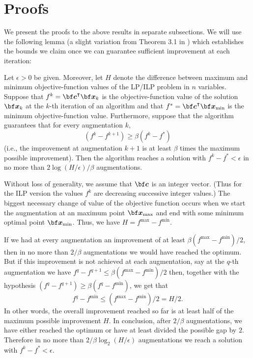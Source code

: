 \documentclass[moor]{informs1hack}              %
\def\ve#1{\mathchoice{\mbox{\boldmath$\displaystyle\bf#1$}}
{\mbox{\boldmath$\textstyle\bf#1$}}
{\mbox{\boldmath$\scriptstyle\bf#1$}}
{\mbox{\boldmath$\scriptscriptstyle\bf#1$}}}
\newcommand\vecc{{\ve c}}
\newcommand\vex{{\ve x}}
\newcommand{\T}{{\intercal}} %
\begin{document}

\section{Proofs}

We present the proofs to the above results in separate subsections. We will use the following  lemma (a slight variation from Theorem 3.1 in \cite{Ahuja+Magnanti+Orlin}) which  establishes the bounds we claim once we can guarantee sufficient improvement at each iteration:
\begin{lemma}
\label{Lemma: Sufficient improvement leads to polynomial algorithm}

Let $\epsilon>0$ be given. Moreover, let $H$ denote the difference between maximum and minimum objective-function values of the LP/ILP problem in $n$ variables.
Suppose that $f^k=\vecc^\T \vex_k$ is the objective-function value of the solution $\vex_k$ at the $k$-th iteration of an algorithm and that $f^*=\vecc^\T \vex_{\min}$ is the minimum objective-function value. Furthermore, suppose that the algorithm guarantees that for every augmentation $k$,
\[
(f^k-f^{k+1})\geq\beta(f^k-f^*)
\]
(i.e., the improvement at augmentation $k+1$ is at least $\beta$ times the maximum possible improvement). Then the algorithm reaches a solution with $f^k-f^*<\epsilon$ in no more than $2 \log{(H/\epsilon)}/\beta$ augmentations.
\end{lemma}

 Without loss of generality, we assume that $\vecc$ is an integer vector. (Thus for the ILP version the values $f^k$ are decreasing successive integer values.) The biggest necessary change of value of the objective function occurs when we start the augmentation at an maximum point $\vex_{\max}$ and end with some minimum optimal point $\vex_{\min}$. Thus, we have $H=f^{\max}-f^{\min}$.

If we had at every augmentation an improvement of at least $\beta (f^{\max}-f^{\min})/2$, then
in no more than $2/\beta$ augmentations we would have reached the optimum. But if this improvement is not achieved at each augmentation, say at the $q$-th augmentation we have $f^q-f^{q+1} \leq \beta (f^{\max}-f^{\min})/2$ then, together with the hypothesis $(f^q-f^{q+1})\geq\beta(f^q-f^{\min})$, we get that
\[
  f^q-f^{\min} \leq (f^{\max}-f^{\min})/2=H/2.
\]
In other words, the overall improvement reached so far is at least half of the maximum possible improvement $H$.
In conclusion, after $2/\beta$ augmentations, we have either reached the optimum or have at least divided the possible gap by $2$. Therefore in no more than $2/\beta \log_2{(H/\epsilon)}$ augmentations we reach a solution with $f^k-f^*<\epsilon$. \Halmos
\endproof
\end{document}
